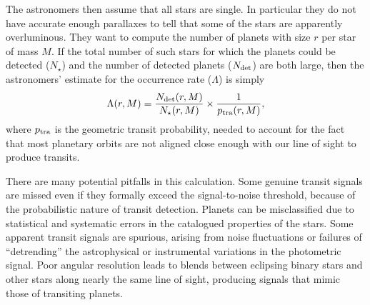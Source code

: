 \documentclass[12pt,modern]{aastex61}
\begin{document}
The astronomers then assume that all stars are single.  In particular
they do not have accurate enough parallaxes to tell that some of the
stars are apparently overluminous. 
They want to compute the number of planets with size $r$ per star of mass $M$.
If the total number of such stars for which the planets could be detected
($N_\star$) and the number of detected planets ($N_{\rm det}$) are both 
large, then the astronomers' estimate for the occurrence rate ($\Lambda$) is 
simply
\begin{equation}
\Lambda(r,M) = \frac{N_{\rm det}(r,M)}{N_\star(r,M)}
                    \times \frac{1}{p_{\rm tra}(r,M)},
\label{eq:occ_rate_simple}
\end{equation}
where $p_{\rm tra}$ is the geometric transit probability, needed to
account for the fact that most planetary orbits are not aligned close
enough with our line of sight to produce transits.

There are many potential pitfalls in this calculation.  Some genuine
transit signals are missed even if they formally exceed the
signal-to-noise threshold, because of the probabilistic nature of
transit detection.  Planets can be misclassified due to statistical
and systematic errors in the catalogued properties of the stars.  Some
apparent transit signals are spurious, arising from noise fluctuations
or failures of ``detrending'' the astrophysical or instrumental
variations in the photometric signal.  Poor angular resolution leads
to blends between eclipsing binary stars and other stars along nearly
the same line of sight, producing signals that mimic those of
transiting planets.
\end{document}
